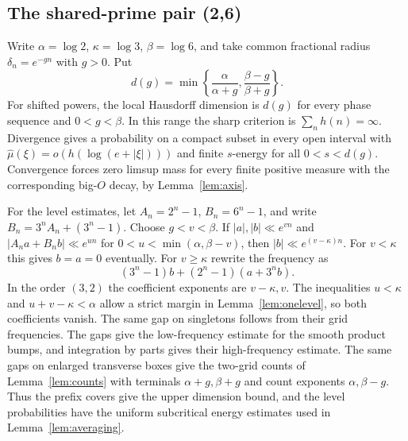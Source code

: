 \documentclass[11pt,a4paper,reqno]{amsart}
\theoremstyle{definition}
\theoremstyle{remark}
\numberwithin{equation}{section}
\begin{document}
\subsection{The shared-prime pair (2,6)}

Write $\alpha=\log 2$, $\kappa=\log 3$, $\beta=\log 6$, and take
common fractional radius $\delta_n=e^{-gn}$ with $g>0$. Put
\[
 d(g)=\min\left\{\frac{\alpha}{\alpha+g},
                          \frac{\beta-g}{\beta+g}\right\}.
\]
For shifted powers, the local Hausdorff dimension is $d(g)$ for every
phase sequence and $0<g<\beta$. In this range the sharp criterion is
$\sum_n h(n)=\infty$. Divergence gives a probability on a compact subset
in every open interval with $\widehat\mu(\xi)=o(h(\log(e+|\xi|)))$
and finite $s$-energy for all $0<s<d(g)$. Convergence forces zero limsup
mass for every finite positive measure with the corresponding big-$O$
decay, by Lemma~\ref{lem:axis}.

For the level estimates, let $A_n=2^n-1$, $B_n=6^n-1$, and write
$B_n=3^n A_n+(3^n-1)$. Choose $g<v<\beta$. If $|a|,|b|\ll e^{vn}$ and
$|A_na+B_nb|\ll e^{un}$ for $0<u<\min(\alpha,\beta-v)$, then
$|b|\ll e^{(v-\kappa)n}$. For $v<\kappa$ this gives $b=a=0$ eventually.
For $v\ge\kappa$ rewrite the frequency as
\[
 (3^n-1)b+(2^n-1)(a+3^nb).
\]
In the order $(3,2)$ the coefficient exponents are $v-\kappa,v$.
The inequalities $u<\kappa$ and $u+v-\kappa<\alpha$ allow a strict
margin in Lemma~\ref{lem:onelevel}, so both coefficients vanish.
The same gap on singletons follows from their grid frequencies. The
gaps give the low-frequency estimate for the smooth product bumps,
and integration by parts gives their high-frequency estimate. The
same gaps on enlarged transverse boxes give the
two-grid counts of Lemma~\ref{lem:counts} with terminals
$\alpha+g,\beta+g$ and count exponents $\alpha,\beta-g$. Thus the
prefix covers give the upper dimension bound, and the level
probabilities have the uniform subcritical energy estimates used in
Lemma~\ref{lem:averaging}.
\end{document}
